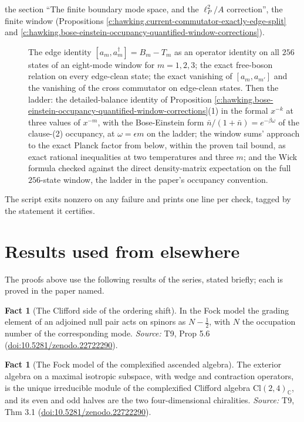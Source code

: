 \documentclass[11pt]{article}
\theoremstyle{definition}
\newtheorem{fact}[theorem]{Fact}
\theoremstyle{plain}
\providecommand{\C}{}\renewcommand{\C}{\mathbb{C}}
\providecommand{\Cl}{}\renewcommand{\Cl}{\mathrm{Cl}}
\begin{document}
\begin{description}
\item[the section ``The finite boundary mode space, and the $\ell_P^2/A$ correction'', the finite window (Propositions \ref{c:hawking.current-commutator-exactly-edge-split} and \ref{c:hawking.bose-einstein-occupancy-quantified-window-corrections}).] The edge identity $[a_m, a_m^\dagger] = B_m - T_m$ as an operator identity on all $256$ states of an eight-mode window for $m = 1, 2, 3$; the exact free-boson relation on every edge-clean state; the exact vanishing of $[a_m, a_{m'}]$ and the vanishing of the cross commutator on edge-clean states. Then the ladder: the detailed-balance identity of Proposition \ref{c:hawking.bose-einstein-occupancy-quantified-window-corrections}(1) in the formal $x^{-k}$ at three values of $x^{-m}$, with the Bose-Einstein form $\bar n/(1 + \bar n) = e^{-\beta\omega}$ of the clause-(2) occupancy, at $\omega = \epsilon m$ on the ladder; the window sums' approach to the exact Planck factor from below, within the proven tail bound, as exact rational inequalities at two temperatures and three $m$; and the Wick formula checked against the direct density-matrix expectation on the full $256$-state window, the ladder in the paper's occupancy convention.
\end{description}

The script exits nonzero on any failure and prints one line per check, tagged by the statement it certifies.

\section{Results used from elsewhere}
The proofs above use the following results of the series, stated briefly; each is proved in the paper named.

\begin{fact}[The Clifford side of the ordering shift]\label{c:correspondence.clifford-side-ordering-shift}
In the Fock model the grading element of an adjoined null pair acts on spinors as $N - \tfrac12$, with $N$ the occupation number of the corresponding mode.
\emph{Source:} T9, Prop 5.6 (\href{https://doi.org/10.5281/zenodo.22722290}{doi:10.5281/zenodo.22722290}).
\end{fact}

\begin{fact}[The Fock model of the complexified ascended algebra]\label{c:correspondence.fock-model-complexified-ascended-algebra}
The exterior algebra on a maximal isotropic subspace, with wedge and contraction operators, is the unique irreducible module of the complexified Clifford algebra $\Cl(2,4)_\C$, and its even and odd halves are the two four-dimensional chiralities.
\emph{Source:} T9, Thm 3.1 (\href{https://doi.org/10.5281/zenodo.22722290}{doi:10.5281/zenodo.22722290}).
\end{fact}
\end{document}
